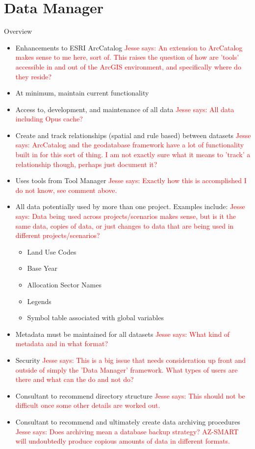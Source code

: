 \documentclass[titlepage]{article}
\begin{document}
\section{Data Manager}
Overview
\begin{itemize}
	\item Enhancements to ESRI ArcCatalog
		\textcolor{red}{Jesse says: An extension to ArcCatalog makes sense to me here, sort of.  This raises the question of how are 'tools' accessible in and out of the ArcGIS environment, and specifically where do they reside?}
	\item At minimum, maintain current functionality
	\item Access to, development, and maintenance of all data
		\textcolor{red}{Jesse says: All data including Opus cache?}
	\item Create and track relationships (spatial and rule based) between datasets
		\textcolor{red}{Jesse says: ArcCatalog and the geodatabase framework have a lot of functionality built in for this sort of thing.  I am not exactly sure what it means to 'track' a relationship though, perhaps just document it?}
	\item Uses tools from Tool Manager
		\textcolor{red}{Jesse says: Exactly how this is accomplished I do not know, see comment above.}
	\item All data potentially used by more than one project. Examples include:
		\textcolor{red}{Jesse says: Data being used across projects/scenarios makes sense, but is it the same data, copies of data, or just changes to data that are being used in different projects/scenarios?}
		\begin{itemize}
			\item Land Use Codes
			\item Base Year
			\item Allocation Sector Names
			\item Legends
			\item Symbol table associated with global variables
		\end{itemize}
	\item Metadata must be maintained for all datasets
		\textcolor{red}{Jesse says: What kind of metadata and in what format?}
	\item Security
		\textcolor{red}{Jesse says: This is a big issue that needs consideration up front and outside of simply the 'Data Manager' framework.  What types of users are there and what can the do and not do?}
	\item Consultant to recommend directory structure
		\textcolor{red}{Jesse says: This should not be difficult once some other details are worked out.}
	\item Consultant to recommend and ultimately create data archiving procedures
		\textcolor{red}{Jesse says: Does archiving mean a database backup strategy?  AZ-SMART will undoubtedly produce copious amounts of data in different formats.}
\end{itemize}
\end{document}
